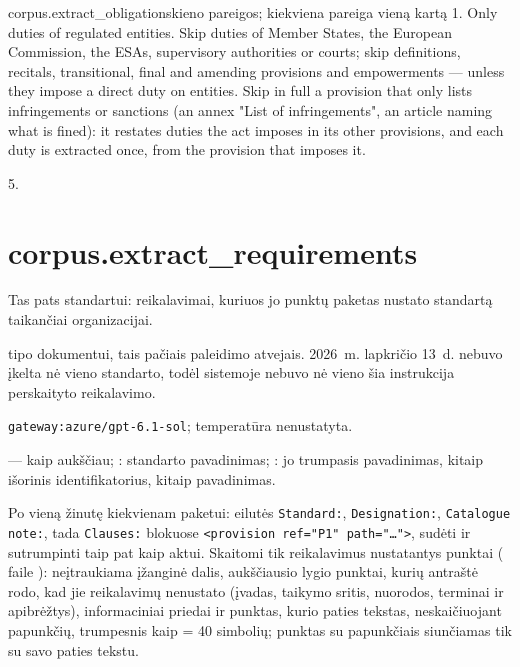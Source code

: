 \par\nopagebreak
\begin{promptexcerpt}{corpus.extract_obligations}{kieno pareigos; kiekviena pareiga vieną kartą}
1. Only duties of regulated entities. Skip duties of Member States, the European
   Commission, the ESAs, supervisory authorities or courts; skip definitions,
   recitals, transitional, final and amending provisions and empowerments — unless
   they impose a direct duty on entities. Skip in full a provision that only lists
   infringements or sanctions (an annex "List of infringements", an article naming
   what is fined): it restates duties the act imposes in its other provisions, and
   each duty is extracted once, from the provision that imposes it.
\end{promptexcerpt}

 5.


\section{corpus.extract\_requirements}\label{sec:aprompts:corpus-extract_requirements}

 Tas pats standartui: reikalavimai, kuriuos jo punktų paketas nustato
standartą taikančiai organizacijai.

   tipo dokumentui, tais
pačiais paleidimo atvejais. 2026~m. lapkričio 13~d. nebuvo įkelta nė vieno standarto, todėl
sistemoje nebuvo nė vieno šia instrukcija perskaityto reikalavimo.

 \texttt{gateway:azure/gpt-6.1-sol}; temperatūra
nenustatyta.

  --- kaip aukščiau; :
standarto pavadinimas; : jo trumpasis pavadinimas, kitaip išorinis
identifikatorius, kitaip pavadinimas.

 Po vieną žinutę kiekvienam paketui: eilutės
\texttt{Standard:}, \texttt{Designation:}, \texttt{Catalogue note:}, tada \texttt{Clauses:}
blokuose \texttt{<provision ref="P1" path="…">}, sudėti ir sutrumpinti taip pat kaip aktui.
Skaitomi tik reikalavimus nustatantys punktai ( faile
): neįtraukiama įžanginė dalis, aukščiausio lygio punktai, kurių
antraštė rodo, kad jie reikalavimų nenustato (įvadas, taikymo sritis, nuorodos, terminai ir
apibrėžtys), informaciniai priedai ir punktas, kurio paties tekstas, neskaičiuojant papunkčių,
trumpesnis kaip  = 40 simbolių; punktas su papunkčiais siunčiamas tik su
savo paties tekstu.

